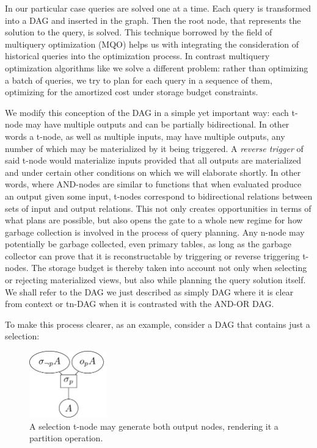 In our particular case queries are solved one at a time. Each query is
transformed into a DAG and inserted in the graph. Then the root node,
that represents the solution to the query, is solved. This technique
borrowed by the field of multiquery optimization (MQO) helps us with
integrating the consideration of historical queries into the
optimization process. In contrast multiquery optimization algorithms
like \cite{mistryMaterializedViewSelection2001} we solve a different
problem: rather than optimizing a batch of queries, we try to plan for
each query in a sequence of them, optimizing for the amortized cost
under storage budget constraints.

We modify this conception of the DAG in a simple yet important way:
each t-node may have multiple outputs and can be partially
bidirectional. In other words a t-node, as well as multiple inputs,
may have multiple outputs, any number of which may be materialized by
it being triggered. A \emph{reverse trigger} of said t-node would
materialize inputs provided that all outputs are materialized and
under certain other conditions on which we will elaborate shortly. In
other words, where AND-nodes are similar to functions that when
evaluated produce an output given some input, t-nodes correspond to
bidirectional relations between sets of input and output
relations. This not only creates opportunities in terms of what plans
are possible, but also opens the gate to a whole new regime for how
garbage collection is involved in the process of query planning. Any
n-node may potentially be garbage collected, even primary tables, as
long as the garbage collector can prove that it is reconstructable by
triggering or reverse triggering t-nodes. The storage budget is
thereby taken into account not only when selecting or rejecting
materialized views, but also while planning the query solution
itself. We shall refer to the DAG we just described as simply DAG
where it is clear from context or tn-DAG when it is contrasted with
the AND-OR DAG.

To make this process clearer, as an example, consider a DAG that
contains just a selection:

\begin{figure}[H]
  \centering
  \includegraphics[width=0.3\textwidth]{./imgs/selnet.pdf}
  \caption{\label{fig:org381fe98}A selection t-node may generate both output nodes, rendering it a partition operation.}
\end{figure}

